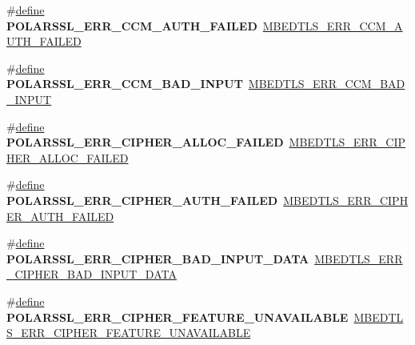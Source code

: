 \begin{DoxyCompactItemize}
\#\hyperlink{structdefine}{define} {\bfseries P\+O\+L\+A\+R\+S\+S\+L\+\_\+\+E\+R\+R\+\_\+\+C\+C\+M\+\_\+\+A\+U\+T\+H\+\_\+\+F\+A\+I\+L\+ED}~\hyperlink{ccm_8h_ae7fda1fbbd14f096374da7ccd54f9d3e}{M\+B\+E\+D\+T\+L\+S\+\_\+\+E\+R\+R\+\_\+\+C\+C\+M\+\_\+\+A\+U\+T\+H\+\_\+\+F\+A\+I\+L\+ED}
\item 
\mbox{\label{compat-1_83_8h_a511bce4dba4b1934174a199e716ed37d}} 
\#\hyperlink{structdefine}{define} {\bfseries P\+O\+L\+A\+R\+S\+S\+L\+\_\+\+E\+R\+R\+\_\+\+C\+C\+M\+\_\+\+B\+A\+D\+\_\+\+I\+N\+P\+UT}~\hyperlink{ccm_8h_a6ad00876b856ad8ac9f366fa7e1cf463}{M\+B\+E\+D\+T\+L\+S\+\_\+\+E\+R\+R\+\_\+\+C\+C\+M\+\_\+\+B\+A\+D\+\_\+\+I\+N\+P\+UT}
\item 
\mbox{\label{compat-1_83_8h_ab4d8385421d4fb4a71f2a00734487688}} 
\#\hyperlink{structdefine}{define} {\bfseries P\+O\+L\+A\+R\+S\+S\+L\+\_\+\+E\+R\+R\+\_\+\+C\+I\+P\+H\+E\+R\+\_\+\+A\+L\+L\+O\+C\+\_\+\+F\+A\+I\+L\+ED}~\hyperlink{cipher_8h_abd30fe33f8b6cf8106e7ea29d3f795cd}{M\+B\+E\+D\+T\+L\+S\+\_\+\+E\+R\+R\+\_\+\+C\+I\+P\+H\+E\+R\+\_\+\+A\+L\+L\+O\+C\+\_\+\+F\+A\+I\+L\+ED}
\item 
\mbox{\label{compat-1_83_8h_a0ed0acc64ce4edbb029dd1d7fd1c8710}} 
\#\hyperlink{structdefine}{define} {\bfseries P\+O\+L\+A\+R\+S\+S\+L\+\_\+\+E\+R\+R\+\_\+\+C\+I\+P\+H\+E\+R\+\_\+\+A\+U\+T\+H\+\_\+\+F\+A\+I\+L\+ED}~\hyperlink{cipher_8h_a67ec20c7b124cb258978a41d5c363def}{M\+B\+E\+D\+T\+L\+S\+\_\+\+E\+R\+R\+\_\+\+C\+I\+P\+H\+E\+R\+\_\+\+A\+U\+T\+H\+\_\+\+F\+A\+I\+L\+ED}
\item 
\mbox{\label{compat-1_83_8h_a7078656ad138756ee9991f15d529d3bb}} 
\#\hyperlink{structdefine}{define} {\bfseries P\+O\+L\+A\+R\+S\+S\+L\+\_\+\+E\+R\+R\+\_\+\+C\+I\+P\+H\+E\+R\+\_\+\+B\+A\+D\+\_\+\+I\+N\+P\+U\+T\+\_\+\+D\+A\+TA}~\hyperlink{cipher_8h_a6ce4034c4ecd0cd1592232ed8a93d648}{M\+B\+E\+D\+T\+L\+S\+\_\+\+E\+R\+R\+\_\+\+C\+I\+P\+H\+E\+R\+\_\+\+B\+A\+D\+\_\+\+I\+N\+P\+U\+T\+\_\+\+D\+A\+TA}
\item 
\mbox{\label{compat-1_83_8h_a8625e259f484845e8fe6103f14f14f85}} 
\#\hyperlink{structdefine}{define} {\bfseries P\+O\+L\+A\+R\+S\+S\+L\+\_\+\+E\+R\+R\+\_\+\+C\+I\+P\+H\+E\+R\+\_\+\+F\+E\+A\+T\+U\+R\+E\+\_\+\+U\+N\+A\+V\+A\+I\+L\+A\+B\+LE}~\hyperlink{cipher_8h_a5093ef5a2ca66691e189c4224098355e}{M\+B\+E\+D\+T\+L\+S\+\_\+\+E\+R\+R\+\_\+\+C\+I\+P\+H\+E\+R\+\_\+\+F\+E\+A\+T\+U\+R\+E\+\_\+\+U\+N\+A\+V\+A\+I\+L\+A\+B\+LE}

\end{DoxyCompactItemize}
